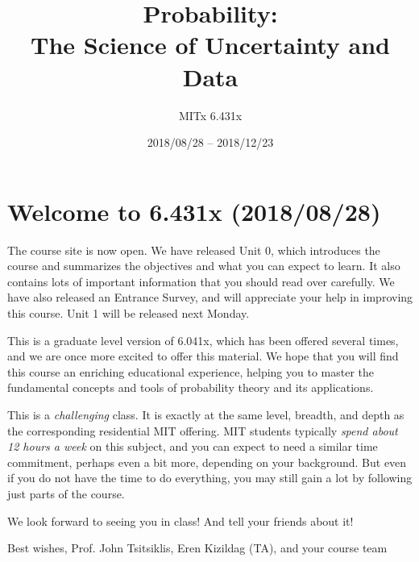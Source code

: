 \documentclass[pdftex, brazil, 12pt, twoside]{article}
\begin{document}
\title{Probability:\\
  The Science of Uncertainty and Data}
\author{MITx 6.431x}
\date{2018/08/28 -- 2018/12/23}
\maketitle
\tableofcontents
\newpage




\section{Welcome to 6.431x (2018/08/28)}
\label{welcome}

The course site is now open. We have released Unit 0, which introduces the course
and summarizes the objectives and what you can expect to learn. It also contains
lots of important information that you should read over carefully. We have also
released an Entrance Survey, and will appreciate your help in improving this course.
Unit 1 will be released next Monday.

This is a graduate level version of 6.041x, which has been offered several times,
and we are once more excited to offer this material. We hope that you will find
this course an enriching educational experience, helping you to master the fundamental
concepts and tools of probability theory and its applications.

This is a \emph{challenging} class. It is exactly at the same level, breadth, and
depth as the corresponding residential MIT offering. MIT students typically \emph{spend
  about 12 hours a week} on this subject, and you can expect to need a similar time
commitment, perhaps even a bit more, depending on your background. But even if you
do not have the time to do everything, you may still gain a lot by following just
parts of the course.

We look forward to seeing you in class! And tell your friends about it!

Best wishes,
Prof. John Tsitsiklis, Eren Kizildag (TA), and your course team




\end{document}
